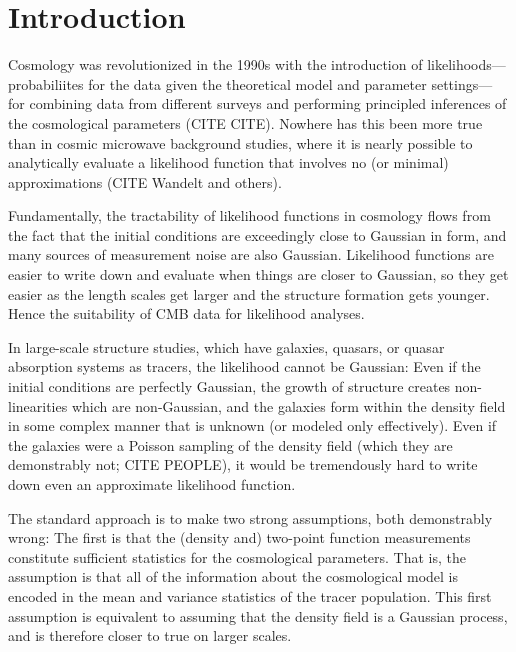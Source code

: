 \documentclass[12pt, preprint]{aastex}
\begin{document}
\section{Introduction}

Cosmology was revolutionized in the 1990s with the introduction of likelihoods---%
pro\-ba\-bil\-iites for the data given the theoretical model and parameter settings---%
for combining data from different surveys and performing principled inferences of
the cosmological parameters (CITE CITE).
Nowhere has this been more true than in cosmic microwave background studies,
where it is nearly possible to analytically evaluate a likelihood function that
involves no (or minimal) approximations (CITE Wandelt and others).

Fundamentally, the tractability of likelihood functions in cosmology flows from
the fact that the initial conditions are exceedingly close to Gaussian in form,
and many sources of measurement noise are also Gaussian.
Likelihood functions are easier to write down and evaluate when things are closer to Gaussian,
so they get easier as the length scales get larger and the structure formation gets
younger.
Hence the suitability of CMB data for likelihood analyses.

In large-scale structure studies, which have galaxies, quasars, or quasar absorption
systems as tracers, the likelihood cannot be Gaussian:
Even if the initial conditions are perfectly Gaussian, the growth of structure
creates non-linearities which are non-Gaussian, and the galaxies form
within the density field in some complex manner that is unknown (or modeled only effectively).
Even if the galaxies were a Poisson sampling of the density field (which they are demonstrably
not; CITE PEOPLE), it would be tremendously hard to write down even an approximate
likelihood function.

The standard approach is to make two strong assumptions, both demonstrably wrong:
The first is that the (density and) two-point function measurements constitute
sufficient statistics for the cosmological parameters.
That is, the assumption is that all of the information about the cosmological model is
encoded in the mean and variance statistics of the tracer population.
This first assumption is equivalent to assuming that the density field is a Gaussian process,
and is therefore closer to true on larger scales.
\end{document}
